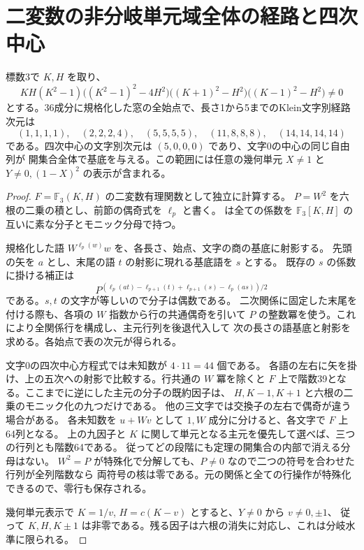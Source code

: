 \section{二変数の非分岐単元域全体の経路と四次中心}
\label{sec:rank-fifteen-bivariate-word-paths}
\begin{theorem}\label{thm:rank-fifteen-bivariate-word-paths}
標数3で $K,H$ を取り、
\[
 KH(K^2-1)\big((K^2-1)^2-4H^2\big)
 \big((K+1)^2-H^2\big)\big((K-1)^2-H^2\big)\ne0
\]
とする。36成分に規格化した窓の全始点で、長さ1から5までのKlein文字別経路次元は
\[
 (1,1,1,1),\quad (2,2,2,4),\quad (5,5,5,5),\quad
 (11,8,8,8),\quad(14,14,14,14)
\]
である。四次中心の文字別次元は $(5,0,0,0)$ であり、文字0の中心の同じ自由列が
開集合全体で基底を与える。この範囲には任意の幾何単元 $X\ne1$ と
$Y\ne0,(1-X)^2$ の表示が含まれる。
\end{theorem}
\begin{proof}
$F=\mathbb F_3(K,H)$ の二変数有理関数として独立に計算する。
$P=W^2$ を六根の二乗の積とし、前節の偶奇式を $\ell_p$ と書く。
 は全ての係数を
$\mathbb F_3[K,H]$ の互いに素な分子とモニック分母で持つ。

規格化した語 $W^{\ell_p(w)}w$ を、各長さ、始点、文字の商の基底に射影する。
先頭の矢を $a$ とし、末尾の語 $t$ の射影に現れる基底語を $s$ とする。
既存の $s$ の係数に掛ける補正は
\[
 P^{(\ell_p(at)-\ell_{p+1}(t)+\ell_{p+1}(s)-\ell_p(as))/2}
\]
である。$s,t$ の文字が等しいので分子は偶数である。
二次関係に固定した末尾を付ける際も、各項の $W$ 指数から行の共通偶奇を引いて
$P$ の整数冪を使う。これにより全関係行を構成し、主元行列を後退代入して
次の長さの語基底と射影を求める。各始点で表の次元が得られる。

文字0の四次中心方程式では未知数が $4\cdot11=44$ 個である。
各語の左右に矢を掛け、上の五次への射影で比較する。行共通の $W$ 冪を除くと
$F$ 上で階数39となる。ここまでに逆にした主元の分子の既約因子は、
$H,K-1,K+1$ と六根の二乗のモニック化の九つだけである。
他の三文字では交換子の左右で偶奇が違う場合がある。
各未知数を $u+Wv$ として $1,W$ 成分に分けると、各文字で $F$ 上64列となる。
上の九因子と $K$ に関して単元となる主元を優先して選べば、三つの行列とも階数64である。
従ってどの段階にも定理の開集合の内部で消える分母はない。
$W^2=P$ が特殊化で分解しても、$P\ne0$ なので二つの符号を合わせた行列が全列階数なら
両符号の核は零である。元の関係と全ての行操作が特殊化できるので、零行も保存される。

幾何単元表示で $K=1/v$, $H=c(K-v)$ とすると、$Y\ne0$ から $v\ne0,\pm1$、
従って $K,H,K\pm1$ は非零である。残る因子は六根の消失に対応し、これは分岐水準に限られる。
\end{proof}
